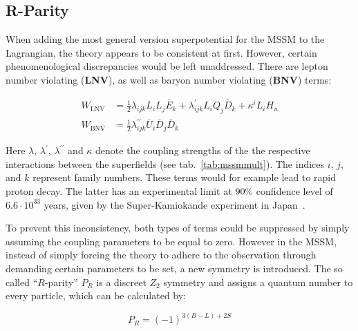 \subsection{R-Parity}

When adding the most general version superpotential for the MSSM to the Lagrangian, the theory appears to be consistent at first. However, certain phenomenological discrepancies would be left unaddressed. There are lepton number violating (\textbf{LNV}), as well as baryon number violating (\textbf{BNV}) terms:


\begin{align}
  \label{eq:lnvlagr}
  W_{\text{LNV}} &= \frac{1}{2} \lambda_{ijk} L_i L_j \bar{E}_k + \lambda^\prime_{ijk} L_i Q_j \bar{D}_k + \kappa^{i} L_i H_u \\
  \label{eq:bnvlagr}
  W_{\text{BNV}} &= \frac{1}{2} \lambda^{\prime\prime}_{ijk} \bar{U}_i \bar{D}_j \bar{D}_k
\end{align}


\noindent Here $\lambda$, $\lambda^\prime$, $\lambda^{\prime\prime}$ and $\kappa$ denote the coupling strengths of the the respective interactions between the superfields (see tab.~\ref{tab:mssmmult}). The indices $i$, $j$, and $k$ represent family numbers. These terms would for example lead to rapid proton decay. The latter has an experimental limit at $90\pct$ confidence level of $6.6 \cdot 10^{33}$ years, given by the Super-Kamiokande experiment in Japan~\cite{protondecay}.

To prevent this inconsistency, both types of terms could be suppressed by simply assuming the coupling parameters to be equal to zero. However in the MSSM, instead of simply forcing the theory to adhere to the observation through demanding certain parameters to be set, a new symmetry is introduced. The so called ``$R$-parity'' $P_R$ is a discreet $Z_2$ symmetry and assigns a quantum number to every particle, which can be calculated by:

\begin{equation}
  \label{eq:rparity}
  P_R = (-1)^{3 (B-L) + 2 S}
\end{equation}

